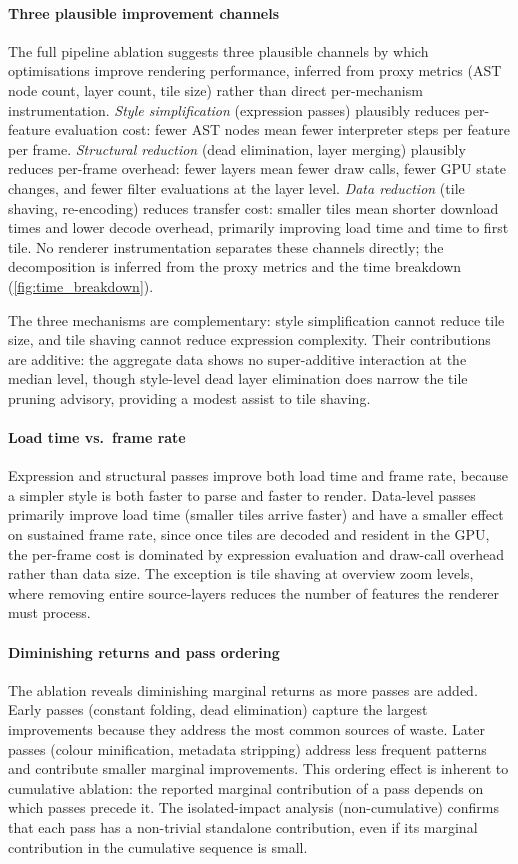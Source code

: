 \paragraph{Three plausible improvement channels}
The full pipeline ablation suggests three plausible channels by which optimisations improve rendering performance, inferred from proxy metrics (AST node count, layer count, tile size) rather than direct per-mechanism instrumentation.
\emph{Style simplification} (expression passes) plausibly reduces per-feature evaluation cost: fewer \ac{AST} nodes mean fewer interpreter steps per feature per frame.
\emph{Structural reduction} (dead elimination, layer merging) plausibly reduces per-frame overhead: fewer layers mean fewer draw calls, fewer GPU state changes, and fewer filter evaluations at the layer level.
\emph{Data reduction} (tile shaving, re-encoding) reduces transfer cost: smaller tiles mean shorter download times and lower decode overhead, primarily improving load time and time to first tile.
No renderer instrumentation separates these channels directly; the decomposition is inferred from the proxy metrics and the time breakdown (\cref{fig:time_breakdown}).

The three mechanisms are complementary: style simplification cannot reduce tile size, and tile shaving cannot reduce expression complexity.
Their contributions are additive: the aggregate data shows no super-additive interaction at the median level, though style-level dead layer elimination does narrow the tile pruning advisory, providing a modest assist to tile shaving.

\paragraph{Load time vs.\ frame rate}
Expression and structural passes improve both load time and frame rate, because a simpler style is both faster to parse and faster to render.
Data-level passes primarily improve load time (smaller tiles arrive faster) and have a smaller effect on sustained frame rate, since once tiles are decoded and resident in the GPU, the per-frame cost is dominated by expression evaluation and draw-call overhead rather than data size.
The exception is tile shaving at overview zoom levels, where removing entire source-layers reduces the number of features the renderer must process.

\paragraph{Diminishing returns and pass ordering}
The ablation reveals diminishing marginal returns as more passes are added.
Early passes (constant folding, dead elimination) capture the largest improvements because they address the most common sources of waste.
Later passes (colour minification, metadata stripping) address less frequent patterns and contribute smaller marginal improvements.
This ordering effect is inherent to cumulative ablation: the reported marginal contribution of a pass depends on which passes precede it.
The isolated-impact analysis (non-cumulative) confirms that each pass has a non-trivial standalone contribution, even if its marginal contribution in the cumulative sequence is small.

